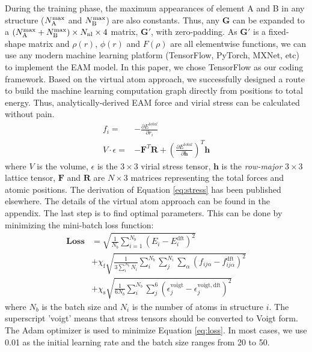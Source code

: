 \documentclass[prb,reprint]{revtex4-2}
\begin{document}
During the training phase, the maximum appearances of element A and B in any 
structure ($N_{\mathrm{A}}^{\mathrm{max}}$ and $N_{\mathrm{B}}^{\mathrm{max}}$) are also constants. Thus, any $\mathbf{G}$ can 
be expanded to a $(N_{\mathrm{A}}^{\mathrm{max}} + N_{\mathrm{B}}^{\mathrm{max}}) \times N_{\mathrm{nl}} \times 4$ matrix, $\mathbf{G}'$, 
with zero-padding. As $\mathbf{G}'$ is a fixed-shape matrix and $\rho(r)$, 
$\phi(r)$ and $F(\rho)$ are all elementwise functions, we can use any modern 
machine learning platform (TensorFlow, PyTorch, MXNet, etc) to implement the EAM 
model. In this paper, we chose TensorFlow as our coding framework. Based on the 
virtual atom approach, we successfully designed a route to build the machine 
learning computation graph directly from positions to total energy. Thus, 
analytically-derived EAM force and virial stress can be calculated without pain.
\begin{align}
\label{eq:forces}
f_{i} = & -\frac{\partial E^{total}}{\partial r_{i}} \\
\label{eq:stress}
V \cdot \epsilon = & -\mathbf{F}^{T}\mathbf{R} + \left(
    \frac{\partial E^{total}}{\partial \mathbf{h}}
\right)^T \mathbf{h}
\end{align}
where $V$ is the volume, $\epsilon$ is the $3 \times 3$ virial stress tensor, 
$\mathbf{h}$ is the \textit{row-major} $3 \times 3$ lattice tensor, $\mathbf{F}$ 
and $\mathbf{R}$ are $N \times 3$ matrices representing the total forces and 
atomic positions. 
The derivation of Equation \ref{eq:stress} has been published elsewhere. The 
details of the virtual atom approach can be found in the appendix. The last step 
is to find optimal parameters. This can be done by minimizing the mini-batch 
loss function:
\begin{align}
\label{eq:loss}
\mathbf{Loss} & = \sqrt{\frac{1}{N_{b}}\sum_{i=1}^{N_{b}}{\left(
    E_{i} - E_{i}^{\mathrm{dft}}
\right)^2}} \nonumber \\
& + \chi_{\mathrm{f}}\sqrt{
    \frac{1}{3\sum_{i}^{N_{b}}{N_i}}\sum_{i}^{N_b}{\sum_{j}^{N_i}{
        \sum_{\alpha}{
            \left(f_{ij\alpha} - f_{ij\alpha}^{\mathrm{dft}}\right)^2
        }
    }}
} \nonumber \\
& + \chi_{\mathrm{s}}\sqrt{\frac{1}{6N_b}\sum_{i}^{N_b}{
    \sum_{j}^{6}{
        \left(
            \epsilon^{\mathrm{voigt}}_{j} - \epsilon^{\mathrm{voigt,dft}}_{j}
        \right)^2
    }
}} 
\end{align} 
where $N_{b}$ is the batch size and $N_i$ is the number of atoms in structure 
$i$. The superscript 'voigt' means that stress tensors should be converted to 
Voigt form. The Adam optimizer is used to minimize Equation \ref{eq:loss}. 
In most cases, we use 0.01 as the initial learning rate and the batch size 
ranges from 20 to 50. 
\end{document}

